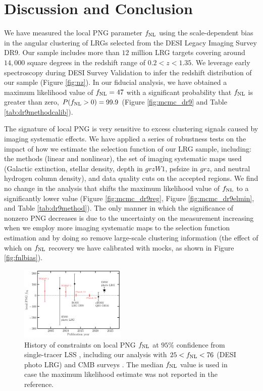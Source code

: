\section{Discussion and Conclusion}\label{sec:conclusion}

We have measured the local PNG parameter $f_{\rm NL}$ using the scale-dependent bias in the angular clustering of LRGs selected from the DESI Legacy Imaging Survey DR9. Our sample includes more than $12$ million LRG targets covering around $14,000$ square degrees in the redshift range of $0.2< z < 1.35$. We leverage early spectroscopy during DESI Survey Validation \citep{desi2023sv} to infer the redshift distribution of our sample (Figure \ref{fig:nz}). In our fiducial analysis, we have obtained a maximum likelihood value of $f_{\rm NL}=47$ with a significant probability that $f_{\rm NL}$ is greater than zero, $P(f_{\rm NL}>0)=99.9$ (Figure \ref{fig:mcmc_dr9} and Table \ref{tab:dr9methodcalib}). 

The signature of local PNG is very sensitive to excess clustering signals caused by imaging systematic effects. We have applied a series of robustness tests on the impact of how we estimate the selection function of our LRG sample, including: the methods (linear and nonlinear), the set of imaging systematic maps used (Galactic extinction, stellar density, depth in $grzW1$, psfsize in $grz$, and neutral hydrogen column density), and data quality cuts on the accepted regions. We find no change in the analysis that shifts the maximum likelihood value of $f_{\rm NL}$ to a significantly lower value (Figure \ref{fig:mcmc_dr9reg}, Figure \ref{fig:mcmc_dr9elmin}, and Table \ref{tab:dr9method}). The only manner in which the significance of nonzero PNG decreases is due to the uncertainty on the measurement increasing when we employ more imaging systematic maps to the selection function estimation and by doing so remove large-scale clustering information (the effect of which on $f_{\rm NL}$ recovery we have calibrated with mocks, as shown in Figure \ref{fig:fnlbias}).

\begin{figure}
    \centering
    \includegraphics[width=0.45\textwidth]{figures/fnl_history.pdf}
    \caption{ History of constraints on local PNG $f_{\rm NL}$ at $95\%$ confidence from single-tracer LSS \citep{slosar2008constraints,2013MNRAS.428.1116R, mueller2022primordial}, including our analysis with $25<f_{\rm NL}<76$ (DESI photo LRG) and CMB surveys \citep{Komatsu_2003, Komatsu_2010, planck13, akrami2019planck}. The median $f_{\rm NL}$ value is used in case the maximum likelihood estimate was not reported in the reference.}
    \label{fig:fnlhist}
\end{figure}

